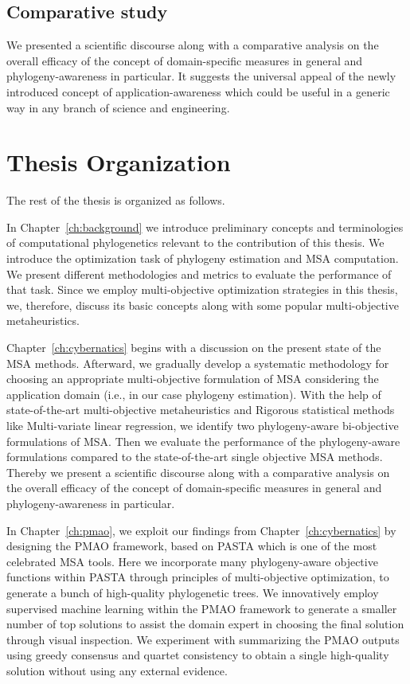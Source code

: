 \subsection{Comparative study}
 We presented a scientific discourse along with a comparative analysis on the overall efficacy of the concept of domain-specific measures in general and phylogeny-awareness in particular. It suggests the universal appeal of the newly introduced concept of application-awareness which could be useful in a generic way in any branch of science and engineering.



\section{Thesis Organization}

The rest of the thesis is organized as follows.

In Chapter~\ref{ch:background} we introduce preliminary concepts and terminologies of computational phylogenetics
relevant to the contribution of this thesis. We introduce the optimization task of phylogeny estimation and MSA computation. We present different methodologies and metrics to evaluate the performance of that task. Since we employ multi-objective optimization strategies in this thesis, we, therefore, discuss its basic concepts along with some popular multi-objective metaheuristics.

Chapter~\ref{ch:cybernatics} begins with a discussion on the present state of the MSA methods. Afterward, we gradually develop a systematic methodology for choosing an appropriate multi-objective formulation of MSA considering the application domain (i.e., in our case phylogeny estimation). With the help of state-of-the-art multi-objective metaheuristics and Rigorous statistical methods like Multi-variate linear regression, we identify two phylogeny-aware bi-objective formulations of MSA. Then we evaluate the performance of the phylogeny-aware formulations compared to the state-of-the-art single objective MSA methods. Thereby we present a scientific discourse along with a comparative analysis on the overall efficacy of the concept of domain-specific measures in general and phylogeny-awareness in particular. 

In Chapter~\ref{ch:pmao}, we exploit our findings from Chapter~\ref{ch:cybernatics} by designing the PMAO framework, based on PASTA which is one of the most celebrated MSA tools. Here we incorporate many phylogeny-aware objective functions within PASTA through principles of multi-objective optimization, to generate a bunch of high-quality phylogenetic trees. We innovatively employ supervised machine learning within the PMAO framework to generate a smaller number of top solutions to assist the domain expert in choosing the final solution through visual inspection. We experiment with summarizing the PMAO outputs using greedy consensus and quartet consistency to obtain a single high-quality solution without using any external evidence.

